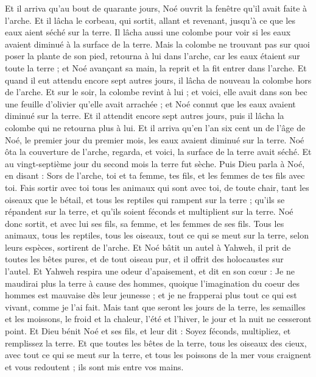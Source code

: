 \begin{multicols}{2}
Et il arriva qu'au bout de quarante jours, Noé ouvrit la fenêtre qu'il avait faite à l'arche.
Et il lâcha le corbeau, qui sortit, allant et revenant, jusqu'à ce que les eaux aient séché sur la terre.
Il lâcha aussi une colombe pour voir si les eaux avaient diminué à la surface de la terre.
Mais la colombe ne trouvant pas sur quoi poser la plante de son pied, retourna à lui dans l'arche, car les eaux étaient sur toute la terre ; et Noé avançant sa main, la reprit et la fit entrer dans l'arche.
Et quand il eut attendu encore sept autres jours, il lâcha de nouveau la colombe hors de l'arche.
Et sur le soir, la colombe revint à lui ; et voici, elle avait dans son bec une feuille d'olivier qu'elle avait arrachée ; et Noé connut que les eaux avaient diminué sur la terre.
Et il attendit encore sept autres jours, puis il lâcha la colombe qui ne retourna plus à lui.
Et il arriva qu'en l'an six cent un de l'âge de Noé, le premier jour du premier mois, les eaux avaient diminué sur la terre. Noé ôta la couverture de l'arche, regarda, et voici, la surface de la terre avait séché.
Et au vingt-septième jour du second mois la terre fut sèche.
Puis Dieu parla à Noé, en disant :
Sors de l'arche, toi et ta femme, tes fils, et les femmes de tes fils avec toi.
Fais sortir avec toi tous les animaux qui sont avec toi, de toute chair, tant les oiseaux que le bétail, et tous les reptiles qui rampent sur la terre ; qu'ils se répandent sur la terre, et qu'ils soient féconds et multiplient sur la terre.
Noé donc sortit, et avec lui ses fils, sa femme, et les femmes de ses fils.
Tous les animaux, tous les reptiles, tous les oiseaux, tout ce qui se meut sur la terre, selon leurs espèces, sortirent de l'arche.
Et Noé bâtit un autel à Yahweh, il prit de toutes les bêtes pures, et de tout oiseau pur, et il offrit des holocaustes sur l'autel.
Et Yahweh respira une odeur d'apaisement, et dit en son cœur : Je ne maudirai plus la terre à cause des hommes, quoique l'imagination du coeur des hommes est mauvaise dès leur jeunesse ; et je ne frapperai plus tout ce qui est vivant, comme je l'ai fait.
Mais tant que seront les jours de la terre, les semailles et les moissons, le froid et la chaleur, l'été et l'hiver, le jour et la nuit ne cesseront point.
\VerseOne{}Et Dieu bénit Noé et ses fils, et leur dit : Soyez féconds, multipliez, et remplissez la terre.
Et que toutes les bêtes de la terre, tous les oiseaux des cieux, avec tout ce qui se meut sur la terre, et tous les poissons de la mer vous craignent et vous redoutent ; ils sont mis entre vos mains.

\end{multicols}
